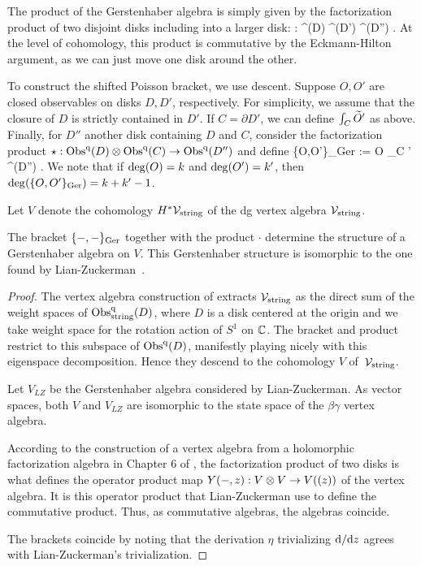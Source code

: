 The product of the Gerstenhaber algebra is simply given by the factorization product of two disjoint disks including into a larger disk:
\ben
\cdot : \Obs^\q(D) \tensor \Obs^\q(D') \to \Obs^\q(D'') .
\een 
At the level of cohomology, this product is commutative by the Eckmann-Hilton argument,
as we can just move one disk around the other.

To construct the shifted Poisson bracket, we use descent.
Suppose $O,O'$ are closed observables on disks $D,D'$, respectively.
For simplicity, we assume that the closure of $D$ is strictly contained in $D'$. 
If $C = \partial D'$, we can define $\int_C \Tilde{O}'$ as above. 
Finally, for $D''$ another disk containing $D$ and $C$, 
consider the factorization product $\star : \Obs^\q(D) \tensor \Obs^\q (C) \to \Obs^\q(D'')$ and define
\ben
\{O,O'\}_{\rm Ger} := O \star \int_C ' \in \Obs^\q (D'') .
\een 
We note that if ${\rm deg}(O) = k$ and ${\rm deg}(O') = k'$, then ${\rm deg}(\{O,O'\}_{\rm Ger}) = k+k' -1$. 

Let $V$ denote the cohomology $H^* \cV_{\rm string}$ of the dg vertex algebra $\cV_{\rm string}$.

\begin{prop} 
The bracket $\{-,-\}_{\rm Ger}$ together with the product $\cdot$ determine the structure of a Gerstenhaber algebra on $V$. 
This Gerstenhaber structure is isomorphic to the one found by Lian-Zuckerman~\cite{LZ1}.
\end{prop}

\begin{proof}
The vertex algebra construction of \cite{CG1} extracts $\cV_{\rm string}$ as the direct sum of the weight spaces of $\Obs^\q_{\rm string}(D)$, 
where $D$ is a disk centered at the origin and we take weight space for the rotation action of $S^1$ on $\CC$.
The bracket and product restrict to this subspace of $\Obs^\q(D)$,
manifestly playing nicely with this eigenspace decomposition. 
Hence they descend to the cohomology $V$ of~$\cV_{\rm string}$.

Let $V_{LZ}$ be the Gerstenhaber algebra considered by Lian-Zuckerman.
As vector spaces, both $V$ and $V_{LZ}$ are isomorphic to the state space of the $\beta\gamma$ vertex algebra.

According to the construction of a vertex algebra from a holomorphic factorization algebra in Chapter 6 of \cite{CG1}, the factorization product of two disks is what defines the operator product map $Y(-,z) : V \tensor V \to V ((z))$ of the vertex algebra.
It is this operator product that Lian-Zuckerman use to define the commutative product.
Thus, as commutative algebras, the algebras coincide. 

The brackets coincide by noting that the derivation $\eta$ trivializing $\d / \d z$ agrees with Lian-Zuckerman's trivialization.
\end{proof}

